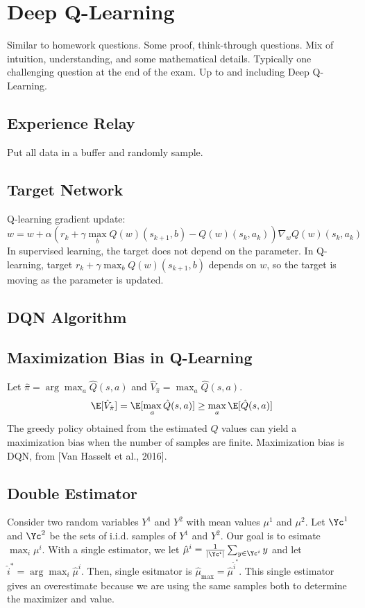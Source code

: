 \chapter{Deep Q-Learning}
Similar to homework questions. Some proof, think-through questions. Mix of intuition, understanding, 
and some mathematical details. Typically one challenging question at the end of the exam. Up to and including Deep Q-Learning. 

\section{Experience Relay}
Put all data in a buffer and randomly sample.

\section{Target Network}
Q-learning gradient update:
\[
  w = w + \alpha(r_k + \gamma \max_{b} Q(w)(s_{k+1}, b) - Q(w)(s_k, a_k)) \nabla_{w} Q(w)(s_k, a_k)
\] 
In supervised learning, the target does not depend on the parameter. In Q-learning, target $r_k + \gamma \max_{b} Q(w)(s_{k+1}, b)$ depends on $w$, so the target is moving as the parameter is updated.
\section{DQN Algorithm} 
\section{Maximization Bias in Q-Learning}
Let $\hat{\pi} = \arg \max_{a} \hat{Q}(s,a)$ and $\hat{V}_{\hat{\pi}} = \max_{a} \hat{Q}(s,a)$.
\[
  \E[\hat{V}_{\hat{\pi}}] = \E[\max_{a} \hat{Q}(s,a)] \geq \max_{a} \E[\hat{Q}(s,a)] 
\] 
The greedy policy obtained from the estimated $Q$ values can yield a maximization bias when the number of samples are finite. Maximization bias is DQN, from [Van Hasselt et al., 2016].

\section{Double Estimator}
Consider two random variables $Y^1$ and $Y^2$ with mean values $\mu^1$ and $\mu^2$. Let $\Yc^1$ and $\Yc^2$ be the sets of i.i.d. samples of $Y^1$ and $Y^2$. Our goal is to esimate $\max_{i} \mu^i$. With a single estimator, we let $\hat{\mu}^i = \frac{1}{|\Yc^i|} \sum_{y\in\Yc^i} y$ and let $\hat{i}^* = \arg\max_{i} \hat{\mu}^i$. Then, single esitmator is $\hat{\mu}_\text{max} = \hat{\mu}^{\hat{i}^*}$. This single estimator gives an overestimate because we are using the same samples both to determine the maximizer and value. \\ 

